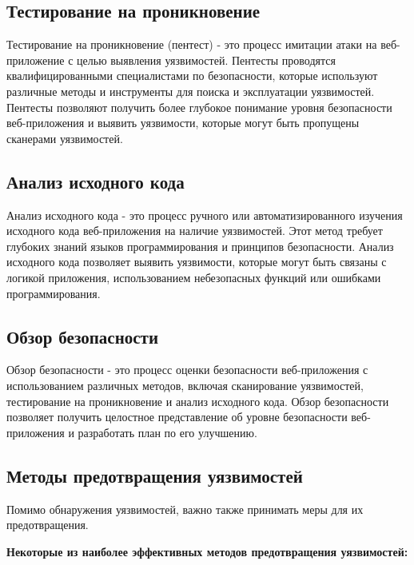 \documentclass[a4paper,12pt]{diplom}
\begin{document}
	 
	 \subsection{Тестирование на проникновение}
	 
	 Тестирование на проникновение (пентест) - это процесс имитации атаки на веб-приложение с целью выявления уязвимостей.  Пентесты проводятся квалифицированными специалистами по безопасности, которые используют различные методы и инструменты для поиска и эксплуатации уязвимостей.  Пентесты позволяют получить более глубокое понимание уровня безопасности веб-приложения и выявить уязвимости, которые могут быть пропущены сканерами уязвимостей.
	 
	 \subsection{Анализ исходного кода}
	 
	 Анализ исходного кода - это процесс ручного или автоматизированного изучения исходного кода веб-приложения на наличие уязвимостей.  Этот метод требует глубоких знаний языков программирования и принципов безопасности.  Анализ исходного кода позволяет выявить уязвимости, которые могут быть связаны с логикой приложения, использованием небезопасных функций или ошибками программирования.
	 
	 \subsection{Обзор безопасности}
	 
	 Обзор безопасности - это процесс оценки безопасности веб-приложения с использованием различных методов, включая сканирование уязвимостей, тестирование на проникновение и анализ исходного кода.  Обзор безопасности позволяет получить целостное представление об уровне безопасности веб-приложения и разработать план по его улучшению.
	 
	 \subsection{Методы предотвращения уязвимостей}
	 
	 Помимо обнаружения уязвимостей, важно также принимать меры для их предотвращения.  
	 
	 \textbf{Некоторые из наиболее эффективных методов предотвращения уязвимостей:}
	 
\end{document}
